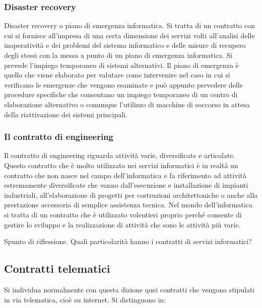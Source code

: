 \subsubsection{Disaster recovery} 

Disaster recovery o piano di emergenza informatica. Si tratta di un contratto con cui si fornisce all'impresa di una certa dimensione dei servizi volti all'analisi delle inoperatività e dei problemi del sistema informatico e delle misure di recupero degli stessi con la messa a punto di un piano di emergenza informatica. Si prevede l'impiego temporaneo di sistemi alternativi. Il piano di emergenza è quello che viene elaborato per valutare come intervenire nel caso in cui si verificano le emergenze che vengono esaminate e può appunto prevedere delle procedure specifiche che consentano un impiego temporaneo di un centro di elaborazione alternativo o comunque l'utilizzo di macchine di soccorso in attesa della riattivazione dei sistemi principali. 

\subsubsection{Il contratto di engineering}

Il contratto di engineering riguarda attività varie, diversificate e articolate. Questo contratto che è molto utilizzato nei servizi informatici è in realtà un contratto che non nasce nel campo dell'informatica e fa riferimento ad attività estremamente diversificate che vanno dall'esecuzione e installazione di impianti industriali, all'elaborazione di progetti per costruzioni architettoniche o anche alla prestazione accessoria di semplice assistenza tecnica. 
Nel mondo dell'informatica si tratta di un contratto che è utilizzato volentieri proprio perché consente di gestire lo sviluppo e la realizzazione di attività che sono le attività più varie. 

Spunto di riflessione. Quali particolarità hanno i contratti di servizi informatici? 

\subsection{Contratti telematici} 

Si individua normalmente con questa dizione quei contratti che vengono stipulati in via telematica, cioè su internet. Si distinguono in:

